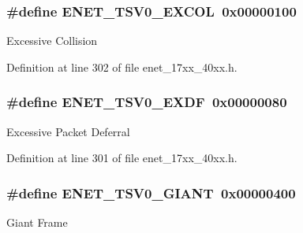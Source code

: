 \subsubsection[{\texorpdfstring{E\+N\+E\+T\+\_\+\+T\+S\+V0\+\_\+\+E\+X\+C\+OL}{ENET_TSV0_EXCOL}}]{\setlength{\rightskip}{0pt plus 5cm}\#define E\+N\+E\+T\+\_\+\+T\+S\+V0\+\_\+\+E\+X\+C\+OL~0x00000100}\hypertarget{group__ENET__17XX__40XX_ga70a4c2d8bcefc36d60b2a006ff3f7496}{}\label{group__ENET__17XX__40XX_ga70a4c2d8bcefc36d60b2a006ff3f7496}
Excessive Collision 

Definition at line 302 of file enet\+\_\+17xx\+\_\+40xx.\+h.

\subsubsection[{\texorpdfstring{E\+N\+E\+T\+\_\+\+T\+S\+V0\+\_\+\+E\+X\+DF}{ENET_TSV0_EXDF}}]{\setlength{\rightskip}{0pt plus 5cm}\#define E\+N\+E\+T\+\_\+\+T\+S\+V0\+\_\+\+E\+X\+DF~0x00000080}\hypertarget{group__ENET__17XX__40XX_ga7cb26ea3f926fb8f7950bbbc98eb2d61}{}\label{group__ENET__17XX__40XX_ga7cb26ea3f926fb8f7950bbbc98eb2d61}
Excessive Packet Deferral 

Definition at line 301 of file enet\+\_\+17xx\+\_\+40xx.\+h.

\subsubsection[{\texorpdfstring{E\+N\+E\+T\+\_\+\+T\+S\+V0\+\_\+\+G\+I\+A\+NT}{ENET_TSV0_GIANT}}]{\setlength{\rightskip}{0pt plus 5cm}\#define E\+N\+E\+T\+\_\+\+T\+S\+V0\+\_\+\+G\+I\+A\+NT~0x00000400}\hypertarget{group__ENET__17XX__40XX_ga2cc9638b9a72a6aca275ce4aed3701a7}{}\label{group__ENET__17XX__40XX_ga2cc9638b9a72a6aca275ce4aed3701a7}
Giant Frame 

